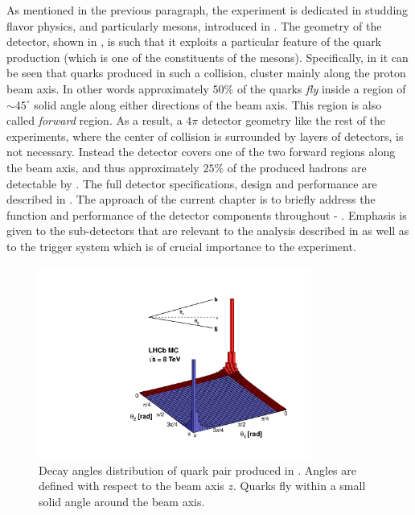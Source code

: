 As mentioned in the previous paragraph, the \lhcb experiment is dedicated in studding flavor physics, 
and particularly \B mesons, introduced in . The geometry of the \lhcb detector, 
shown in , is such that it exploits a particular feature of the 
\bquark quark production (which is one of the constituents of the \B mesons). Specifically, in  
it can be seen that \bquark quarks produced in such a collision, cluster mainly along the proton beam axis. 
In other words approximately $50\%$ of the \bquark quarks {\it fly} inside a region of $\sim 45^\circ$ solid 
angle along either directions of the beam axis. This region is also called {\it forward} region. 
As a result, a $4\pi$ detector geometry like the rest of the \lhc experiments, where the center of collision 
is surrounded by layers of detectors, is not necessary. Instead the \lhcb detector covers one of the two 
forward regions along the beam axis, and thus approximately $25\%$ of the produced \bquark hadrons are 
detectable by \lhcb. The full \lhcb detector specifications, design and performance are described in \cite{Aaij:2014jba}.
The approach of the current chapter is to briefly address the function and performance of the detector components
throughout  - . Emphasis is given to the sub-detectors that are relevant
to the analysis described in  as well as to the trigger system which is of crucial importance
to the \lhcb experiment.

\begin{figure}[t]
  \centering
  \includegraphics[width=0.8\textwidth, trim=0cm 0cm 0cm 2.5cm, clip=true]{Figures/Chapter2/08_rad_acc_scheme_right}
  \caption{Decay angles distribution of \bquark quark pair produced in \lhcb. Angles are defined with
           respect to the beam axis $z$. Quarks fly within a small solid angle around the beam axis.}
  \label{bb_roduction_angles}
\end{figure}
